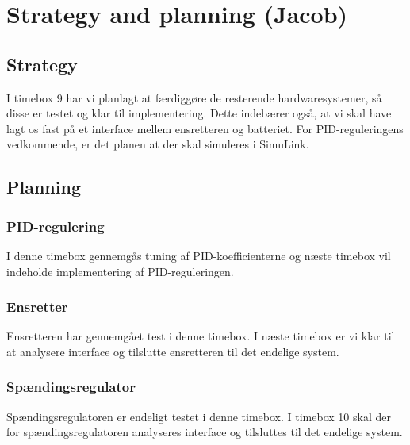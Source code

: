 
\section{Strategy and planning (Jacob)}
\label{sec:strat-plann-jacob}

\subsection{Strategy}
\label{sec:strategy}


I timebox 9 har vi planlagt at færdiggøre de resterende hardwaresystemer, så disse er testet og klar til implementering. Dette indebærer også, at vi skal have lagt os fast på et interface mellem ensretteren og batteriet. For PID-reguleringens vedkommende, er det planen at der skal simuleres i SimuLink.

\subsection{Planning}
\label{sec:planning}


\subsubsection{PID-regulering}
\label{sec:pid-regulering}

I denne timebox gennemgås tuning af PID-koefficienterne og næste timebox vil indeholde implementering af PID-reguleringen.

\subsubsection{Ensretter}
\label{sec:ensretter}


Ensretteren har gennemgået test i denne timebox. I næste timebox er vi klar til at analysere interface og tilslutte ensretteren til det endelige system. 

\subsubsection{Spændingsregulator }
\label{sec:spandingsregulator-}


Spændingsregulatoren er endeligt testet i denne timebox. I timebox 10 skal der for spændingsregulatoren analyseres interface og tilsluttes til det endelige system. 

